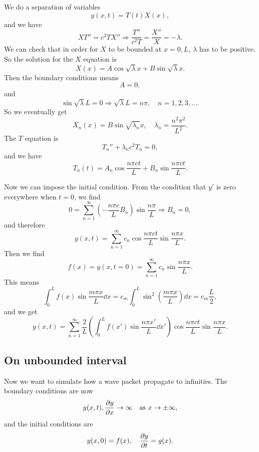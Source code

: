 \documentclass[hyperref, a4paper]{article}
\begin{document}
We do a separation of variables 
\begin{equation}
    y(x, t) = T(t) X(x), 
\end{equation}
and we have 
\begin{equation}
    X T '' = c^2 T X'' \Rightarrow \frac{T''}{c^2 T} = \frac{X''}{X} = - \lambda.
\end{equation}
We can check that in order for $X$ to be bounded at $x = 0, L$, 
$\lambda$ has to be positive. 
So the solution for the $X$ equation is 
\[
    X(x) = A \cos \sqrt{\lambda} x + B \sin \sqrt{\lambda} x.
\]
Then the boundary conditions means 
\[
    A = 0, 
\]
and 
\[
    \sin \sqrt{\lambda} L = 0 \Rightarrow \sqrt{\lambda} L = n \pi, \quad 
    n = 1, 2, 3, \ldots.
\]
So we eventually get 
\begin{equation}
    X_n(x) = B \sin \sqrt{\lambda_n} x, \quad \lambda_n = \frac{n^2 \pi^2}{L^2}.
\end{equation}
The $T$ equation is 
\[
    T_n'' + \lambda_n c^2 T_n = 0, 
\]
and we have 
\begin{equation}
    T_n(t) = A_n \cos \frac{n \pi c t}{L} + B_n \sin \frac{n \pi c t}{L}.
\end{equation}

Now we can impose the initial condition.
From the condition that $y'$ is zero everywhere when $t = 0$, 
we find 
\[
    0 = \sum_{n = 1}^{\infty} \left(- \frac{n \pi c}{L} B_n \right) \sin \frac{n \pi}{L} 
    \Rightarrow B_n = 0,
\]
and therefore 
\[
    y(x, t) = \sum_{n = 1}^{\infty}
    c_n \cos \frac{n \pi c t}{L} \sin \frac{n \pi x}{L}.
\]
Then we find 
\[
    f(x) = y(x, t = 0) 
    = \sum_{n = 1}^{\infty}
    c_n \sin \frac{n \pi x}{L}.
\]
This means 
\[
    \int_{0}^{L} f(x) \sin \frac{m \pi x}{L} \dd{x}
    = c_m \int_{0}^{L} \sin^2\left(\frac{m \pi x}{L}\right) \dd{x} 
    = c_m \frac{L}{2},
\]
and we get 
\begin{equation}
    y(x, t) = \sum_{n=1}^{\infty} 
    \frac{2}{L} \left(\int_{0}^{L} f(x') \sin \frac{n \pi x'}{L} \dd{x'}\right)
    \cos \frac{n \pi c t}{L} \sin \frac{n \pi x}{L} .
\end{equation}

\subsection{On unbounded interval}

Now we want to simulate how a wave packet propagate to infinities.
The boundary conditions are now 
\begin{equation}
    y(x, t), \pdv{y}{x} \to \infty \quad \text{as $x \to \pm \infty$},
\end{equation}
and the initial conditions are 
\begin{equation}
    y(x, 0) = f(x), \quad 
    \pdv{y}{t} (x, 0) = g(x).
\end{equation}
\end{document}
